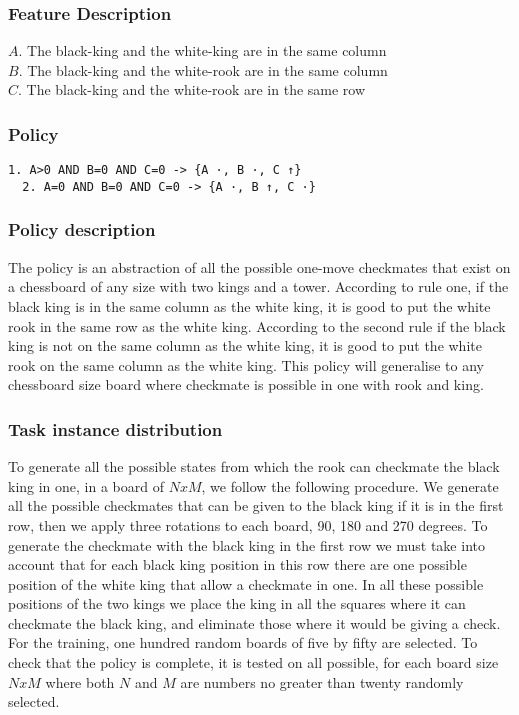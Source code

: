 \documentclass[a4paper]{article}
\begin{document}
\subsubsection{Feature Description}
$A$. The black-king and the white-king are in the same column\\
$B$. The black-king and the white-rook are in the same column\\
$C$. The black-king and the white-rook are in the same row

\subsubsection{Policy}
\begin{Verbatim}[fontsize=\footnotesize]
  1. A>0 AND B=0 AND C=0 -> {A ·, B ·, C ↑}
  2. A=0 AND B=0 AND C=0 -> {A ·, B ↑, C ·}
\end{Verbatim}

\subsubsection{Policy description}
The policy is an abstraction of all the possible one-move checkmates that exist on a chessboard of any size with two kings and a tower. According to rule one, if the black king is in the same column as the white king, it is good to put the white rook in the same row as the white king. According to the second rule if the black king is not on the same column as the white king, it is good to put the white rook on the same column as the white king. This policy will generalise to any chessboard size board where checkmate is possible in one with rook and king.

\subsubsection{Task instance distribution}
To generate all the possible states from which the rook can checkmate the black king in one, in a board of $NxM$, we follow the following procedure. We generate all the possible checkmates that can be given to the black king if it is in the first row, then we apply three rotations to each board, 90, 180 and 270 degrees. To generate the checkmate with the black king in the first row we must take into account that for each black king position in this row there are one possible position of the white king that allow a checkmate in one. In all these possible positions of the two kings we place the king in all the squares where it can checkmate the black king, and eliminate those where it would be giving a check. For the training, one hundred random boards of five by fifty are selected. To check that the policy is complete, it is tested on all possible, for each board size $NxM$ where both $N$ and $M$ are numbers no greater than twenty randomly selected.
\end{document}
